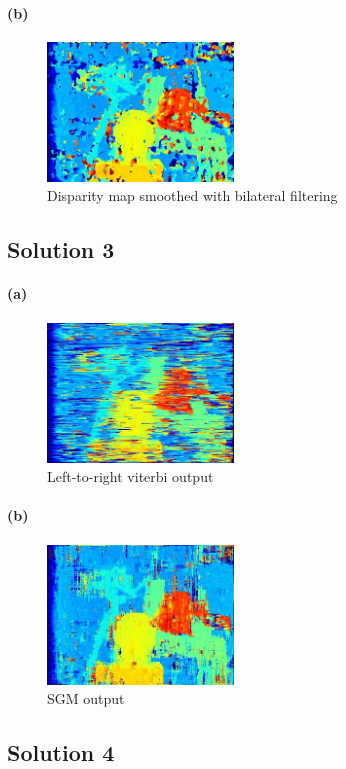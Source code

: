 \documentclass{article}
\newcommand{\solution}[1]{\clearpage \subsection*{Solution #1}}
\newcommand{\spart}[1]{\paragraph{(#1)}}
\begin{document}
\spart{b}

\begin{figure}[!h]
  \centering
  \includegraphics[height=10em]{code/outputs/prob2b.jpg}
  \caption{Disparity map smoothed with bilateral filtering}
\end{figure}

\solution{3}

\spart{a}

\begin{figure}[!h]
  \centering
  \includegraphics[height=10em]{code/outputs/prob3a.jpg}
  \caption{Left-to-right viterbi output}
\end{figure}

\spart{b}

\begin{figure}[!h]
  \centering
  \includegraphics[height=10em]{code/outputs/prob3b.jpg}
  \caption{SGM output}
\end{figure}

\solution{4}
\end{document}
